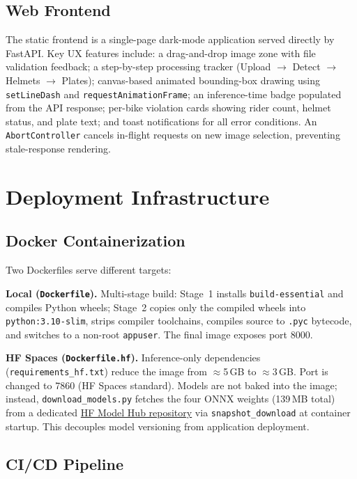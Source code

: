 \documentclass[10pt,twocolumn]{article}
\begin{document}
\subsection{Web Frontend}

The static frontend is a single-page dark-mode application served directly
by FastAPI. Key UX features include: a drag-and-drop image zone with
file validation feedback; a step-by-step processing tracker
(Upload $\to$ Detect $\to$ Helmets $\to$ Plates); canvas-based animated
bounding-box drawing using \texttt{setLineDash} and
\texttt{requestAnimationFrame}; an inference-time badge populated from the
API response; per-bike violation cards showing rider count, helmet status,
and plate text; and toast notifications for all error conditions.
An \texttt{AbortController} cancels in-flight requests on new image
selection, preventing stale-response rendering.

\section{Deployment Infrastructure}

\subsection{Docker Containerization}

Two Dockerfiles serve different targets:

\textbf{Local (\texttt{Dockerfile}).} Multi-stage build: Stage~1 installs
\texttt{build-essential} and compiles Python wheels; Stage~2 copies only the
compiled wheels into \texttt{python:3.10-slim}, strips compiler toolchains,
compiles source to \texttt{.pyc} bytecode, and switches to a non-root
\texttt{appuser}. The final image exposes port 8000.

\textbf{HF Spaces (\texttt{Dockerfile.hf}).} Inference-only dependencies
(\texttt{requirements\_hf.txt}) reduce the image from $\approx$5\,GB to
$\approx$3\,GB. Port is changed to 7860 (HF Spaces standard). Models are
not baked into the image; instead, \texttt{download\_models.py} fetches the
four ONNX weights (139\,MB total) from a dedicated
\href{https://huggingface.co/hv-123/traffic-sentinel-models}{HF Model Hub
repository} via \texttt{snapshot\_download} at container startup. This
decouples model versioning from application deployment.

\subsection{CI/CD Pipeline}
\end{document}
